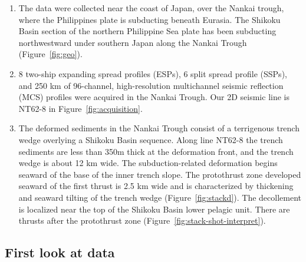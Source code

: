 \begin{enumerate}

\item The data were collected near the coast of Japan, over the Nankai trough, where the Philippines plate is subducting beneath Eurasia. The Shikoku Basin section of the northern Philippine Sea plate has been subducting northwestward under southern Japan along the Nankai Trough (Figure~\ref{fig:geo}).

\item 8 two-ship expanding spread profiles (ESPs), 6 split spread profile (SSPs), and 250 km of 96-channel, high-resolution multichannel seismic reflection (MCS) profiles were acquired in the Nankai Trough. Our 2D seismic line is NT62-8 in Figure~\ref{fig:acquisition}.

\item The deformed sediments in the Nankai Trough consist of a terrigenous trench wedge overlying a Shikoku Basin sequence. Along line NT62-8 the trench sediments are less than 350m thick at the deformation front, and the trench wedge is about 12 km wide. The subduction-related deformation begins seaward of the base of the inner trench slope. The protothrust zone developed seaward of the first thrust is 2.5 km wide and is characterized by thickening and seaward tilting of the trench wedge (Figure~\ref{fig:stackd}). The decollement is localized near the top of the Shikoku Basin lower pelagic unit. There are thrusts after the protothrust zone (Figure~\ref{fig:stack-shot-interpret}).    


\end{enumerate}\clearpage

\subsection{First look at data}


